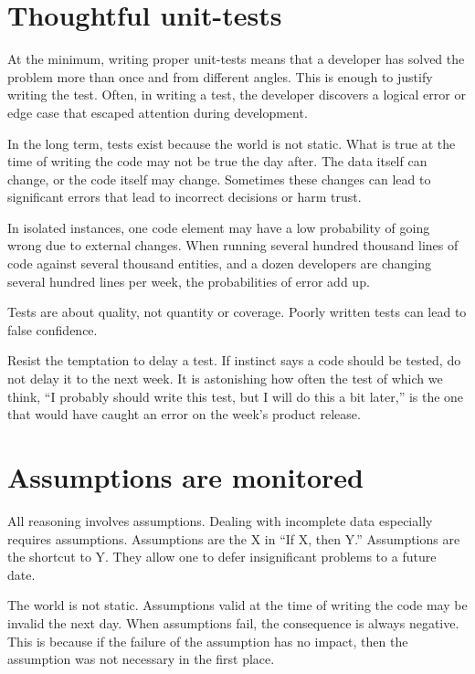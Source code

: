 \documentclass[10pt,openany,10pt]{book}
\begin{document}
\section{Thoughtful unit-tests}\label{thoughtful-unit-tests}

At the minimum, writing proper unit-tests means that a developer has
solved the problem more than once and from different angles. This is
enough to justify writing the test. Often, in writing a test, the
developer discovers a logical error or edge case that escaped attention
during development.

In the long term, tests exist because the world is not static. What is
true at the time of writing the code may not be true the day after. The
data itself can change, or the code itself may change. Sometimes these
changes can lead to significant errors that lead to incorrect decisions
or harm trust.

In isolated instances, one code element may have a low probability of
going wrong due to external changes. When running several hundred
thousand lines of code against several thousand entities, and a dozen
developers are changing several hundred lines per week, the
probabilities of error add up.

Tests are about quality, not quantity or coverage. Poorly written tests
can lead to false confidence.

Resist the temptation to delay a test. If instinct says a code should be
tested, do not delay it to the next week. It is astonishing how often
the test of which we think, ``I probably should write this test, but I
will do this a bit later,'' is the one that would have caught an error
on the week's product release.

\section{Assumptions are monitored}\label{assumptions-are-monitored}

All reasoning involves assumptions. Dealing with incomplete data
especially requires assumptions. Assumptions are the X in ``If X, then
Y.'' Assumptions are the shortcut to Y. They allow one to defer
insignificant problems to a future date.

The world is not static. Assumptions valid at the time of writing the
code may be invalid the next day. When assumptions fail, the consequence
is always negative. This is because if the failure of the assumption has
no impact, then the assumption was not necessary in the first place.
\end{document}
